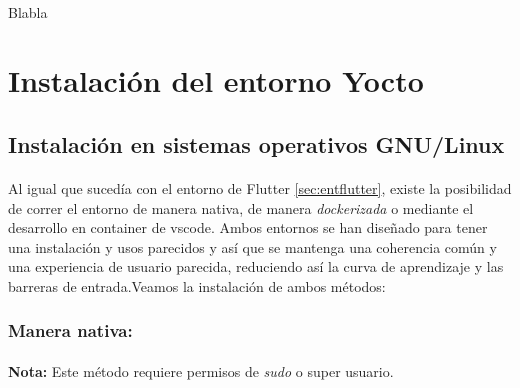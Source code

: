 \paragraph{}Blabla

\newpage

\section{Instalación del entorno Yocto}

\subsection{Instalación en sistemas operativos GNU/Linux}

\paragraph{}Al igual que sucedía con el entorno de Flutter \ref{sec:entflutter}, existe
la posibilidad de correr el entorno de manera nativa, de manera \emph{dockerizada} o
mediante el desarrollo en container de \gls{vscode}.
Ambos entornos se han diseñado para tener una instalación y usos parecidos y así que
se mantenga una coherencia común y una experiencia de usuario parecida, reduciendo así
la curva de aprendizaje y las barreras de entrada.Veamos la instalación de ambos métodos:

\subsubsection{Manera nativa:}

\paragraph{}\textbf{Nota:} Este método requiere permisos de \emph{sudo} o super usuario.

